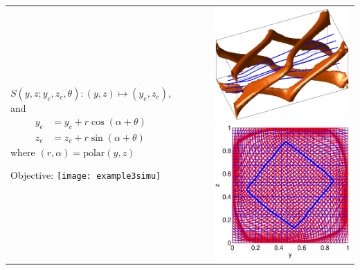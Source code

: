 \documentclass[12pt,t]{beamer}
\begin{document}

\begin{frame}
\begin{tabular}{lr}
 \begin{minipage}[b]{0.5\textwidth}
$S(y,z;y_c,z_c,\theta): (y,z)\mapsto (y_e,z_e)$, and
  \begin{eqnarray*}
     y_e &= y_c + r \cos(\alpha+\theta) \\
     z_e &= z_c + r \sin(\alpha+\theta)
  \end{eqnarray*} 
where $(r,\alpha)=\text{polar}(y,z)$
 
Objective:
\texttt{[image: example3simu]}
 \end{minipage}
 & \begin{minipage}[b]{6cm}
      \includegraphics[width=0.8\textwidth,trim=1cm 0cm 1cm 1cm,clip]{example3structure}
      \includegraphics[width=0.8\textwidth,trim=1cm 1cm 1cm 1cm]{example3grid}
 \end{minipage}
\end{tabular}

\end{frame}
\end{document}
